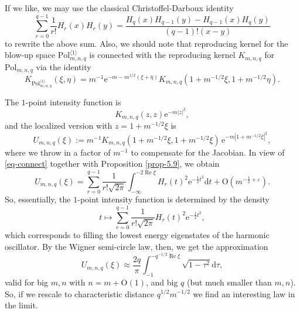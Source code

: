 \documentclass{birkart}
\theoremstyle{definition}
\theoremstyle{remark}
\numberwithin{equation}{section}
\numberwithin{figure}{section}
\newcommand{\e}{\mathrm e}
\newcommand{\1}{{\mathbf 1}}
\newcommand{\D}{{\mathbb D}}
\newcommand{\Ordo}{\mathrm{O}}
\newcommand{\re}{\operatorname{Re}}
\newcommand{\diff}{{\mathrm d}}
\begin{document}
If we like, we may use the classical Christoffel-Darboux identity
\begin{equation}
\label{eq-CD}
\sum_{r=0}^{q-1}\frac{1}{r!}H_r(x)H_r(y)=
\frac{H_q(x)H_{q-1}(y)-H_{q-1}(x)H_{q}(y)}{(q-1)!(x-y)}
\end{equation}
to rewrite the above sum. Also, we should note that reproducing kernel for
the blow-up space $\mathrm{Pol}^{\langle1\rangle}_{m,n,q}$ is connected with
the reproducing kernel $K_{m,n,q}$ for $\mathrm{Pol}_{m,n,q}$ via
the identity
\begin{equation}
\label{eq-connect}
K_{\mathrm{Pol}^{\langle1\rangle}_{m,n,q}}(\xi,\eta)=
m^{-1}\e^{-m-m^{1/2}(\xi+\bar\eta)}K_{m,n,q}(1+m^{-1/2}\xi,1+m^{-1/2}\eta).
\end{equation}
\medskip

The $1$-point intensity function is
\[
K_{m,n,q}(z,z)\e^{-m|z|^2},
\]
and the localized version with $z=1+m^{-1/2}\xi$ is
\[
U_{m,n,q}(\xi):=
m^{-1}K_{m,n,q}(1+m^{-1/2}\xi,1+m^{-1/2}\xi)\,\e^{-m|1+m^{-1/2}\xi|^2},
\]
where we throw in a factor of $m^{-1}$ to compensate for the Jacobian.
In view of \eqref{eq-connect} together with Proposition \ref{prop-5.9},
we obtain
\[
U_{m,n,q}(\xi)=\sum_{r=0}^{q-1}\frac{1}{r!\sqrt{2\pi}}\int_{-\infty}^{-2\re\xi}
H_r(t)^2\e^{-\frac12t^2}\diff t+\Ordo(m^{-\frac12+\varepsilon}).
\]
So, essentially, the $1$-point intensity function is determined by the density 
\[
t\mapsto\sum_{r=0}^{q-1}\frac{1}{r!\sqrt{2\pi}}
H_r(t)^2\e^{-\frac12t^2},
\]
which corresponds to filling the lowest energy eigenstates of the harmonic
oscillator. By the Wigner semi-circle law, then, we get the approximation
\[
U_{m,n,q}(\xi)\approx
\frac{2q}{\pi}\int_{-1}^{-q^{-1/2}\re\xi}\sqrt{1-\tau^2}\diff\tau,
\]
valid for big $m,n$ with $n=m+\Ordo(1)$, and big $q$ (but much smaller than
$m,n$). So, if we rescale to characteristic distance $q^{1/2}m^{-1/2}$
we find an interesting law in the limit. 

\medskip
\end{document}
